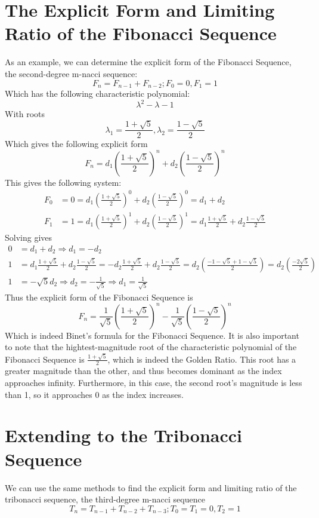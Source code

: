 \documentclass[11pt]{article}
\begin{document}
\section{The Explicit Form and Limiting Ratio of the Fibonacci Sequence}
As an example, we can determine the explicit form of the Fibonacci Sequence, the second-degree m-nacci sequence:
$$F_n=F_{n-1}+F_{n-2}; F_0=0, F_1=1$$
Which has the following characteristic polynomial:
$$\lambda^2-\lambda-1$$
With roots
$$\lambda_1=\frac{1+\sqrt{5}}{2},\lambda_2=\frac{1-\sqrt{5}}{2}$$
Which gives the following explicit form
$$F_n=d_1\left(\frac{1+\sqrt{5}}{2}\right)^n+d_2\left(\frac{1-\sqrt{5}}{2}\right)^n$$
This gives the following system:
\begin{align*}
    F_0&=0=d_1\left(\frac{1+\sqrt{5}}{2}\right)^0+d_2\left(\frac{1-\sqrt{5}}{2}\right)^0 = d_1+d_2 \\
    F_1&=1=d_1\left(\frac{1+\sqrt{5}}{2}\right)^1+d_2\left(\frac{1-\sqrt{5}}{2}\right)^1 = d_1\frac{1+\sqrt{5}}{2}+d_2\frac{1-\sqrt{5}}{2}
\end{align*}
Solving gives 
\begin{align*}
    0 &= d_1+d_2 \Rightarrow d_1=-d_2\\
    1 &= d_1\frac{1+\sqrt{5}}{2}+d_2\frac{1-\sqrt{5}}{2} = -d_2\frac{1+\sqrt{5}}{2}+d_2\frac{1-\sqrt{5}}{2}= d_2\left(\frac{-1-\sqrt{5}+1-\sqrt{5}}{2}\right)= d_2\left(\frac{-2\sqrt{5}}{2}\right) \\
    1 &= -\sqrt{5}d_2\Rightarrow d_2=-\frac{1}{\sqrt{5}} \Rightarrow d_1=\frac{1}{\sqrt{5}}
\end{align*}
Thus the explicit form of the Fibonacci Sequence is
$$F_n=\frac{1}{\sqrt{5}}\left(\frac{1+\sqrt{5}}{2}\right)^n-\frac{1}{\sqrt{5}}\left(\frac{1-\sqrt{5}}{2}\right)^n$$
Which is indeed Binet's formula for the Fibonacci Sequence.
It is also important to note that the hightest-magnitude root of the characteristic polynomial of the Fibonacci Sequence is $\frac{1+\sqrt{5}}{2}$, which is indeed the Golden Ratio. This root has a greater magnitude than the other, and thus becomes dominant as the index approaches infinity. Furthermore, in this case, the second root's magnitude is less than 1, so it approaches 0 as the index increases.  

\section{Extending to the Tribonacci Sequence}
We can use the same methods to find the explicit form and limiting ratio of the tribonacci sequence, the third-degree m-nacci sequence
$$T_n=T_{n-1}+T_{n-2}+T_{n-3};T_0=T_1=0, T_2=1$$
\end{document}
